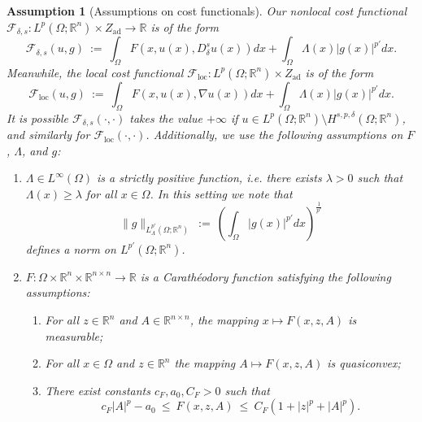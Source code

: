 \documentclass[11pt, reqno]{amsart}   	%
\theoremstyle{plain}
\numberwithin{equation}{section}
\newtheorem{assumption}[thm]{Assumption}
\def\de{\delta}
\def\la{\lambda}
\def\La{\Lambda}
\def\Om{\Omega}
\def\R{\mathbb{R}}
\def\grad{\nabla}
\def\loc{\text{loc}}
\begin{document}
 \begin{assumption}[Assumptions on cost functionals]\label{Assump: costFuncAssumptions}
        Our nonlocal cost functional $\mathcal{F}_{\de, s}: L^p(\Om; \R^n) \times Z_{\text{ad}} \rightarrow \R$ is of the form
	\begin{equation}\label{Eq: costFuncNL}
		\mathcal{F}_{\de, s}(u, g) \ := \ \int_{\Om}F(x, u(x), D^s_{\de}u(x))dx + \int_{\Om} \La(x) |g(x)|^{p'} dx.
	\end{equation}
    Meanwhile, the local cost functional $\mathcal{F}_{\loc}: L^p(\Om; \R^n) \times Z_{\text{ad}}$ is of the form
    \begin{equation}\label{Eq: costFuncL}
		\mathcal{F}_{\loc}(u, g) \ := \ \int_{\Om}F(x, u(x), \grad u(x))dx + \int_{\Om} \La(x) |g(x)|^{p'} dx.
	\end{equation}
    It is possible $\mathcal{F}_{\de, s}(\cdot, \cdot)$ takes the value $+\infty$ if $u \in L^p(\Om; \R^n)\setminus H^{s,p,\de}(\Om; \R^n)$, and similarly for $\mathcal{F}_{\loc}(\cdot, \cdot)$. Additionally, we use the following assumptions on $F$, $\Lambda$, and $g$:
    \begin{enumerate}
     \item $\La \in L^{\infty}(\Om)$ is a strictly positive function, i.e. there exists $\la > 0$ such that $\La(x) \geq \la$ for all $x \in \Om$. In this setting we note that
     \begin{equation}\label{Eq: weightNormLp'}
         \|g\|_{L^{p'}_{\La}(\Om; \R^n)} \ := \ \left(\int_{\Om}|g(x)|^{p'}dx\right)^{\frac{1}{p'}}
     \end{equation}
     defines a norm on $L^{p'}(\Om; \R^n)$.
    \item $F: \Om \times \R^n \times \R^{n \times n} \rightarrow \R$ is a Carathéodory function satisfying the following assumptions:
	\begin{enumerate}
		\item For all $z \in \R^n$ and $A \in \R^{n \times n}$, the mapping $x \mapsto F(x, z, A)$ is measurable;
		\item For all $x \in \Om$ and $z \in \R^n$ the mapping $A \mapsto F(x, z, A)$ is  quasiconvex;
		\item There exist constants $c_F, a_0, C_F > 0$ such that
		\begin{equation}\label{Eq: CostBounds}
			c_F|A|^p - a_0 \ \leq \ F(x, z, A) \ \leq \ C_F(1 + |z|^p + |A|^p).
		\end{equation}
    \end{enumerate}
    \end{enumerate}
    
    \end{assumption}
\end{document}
